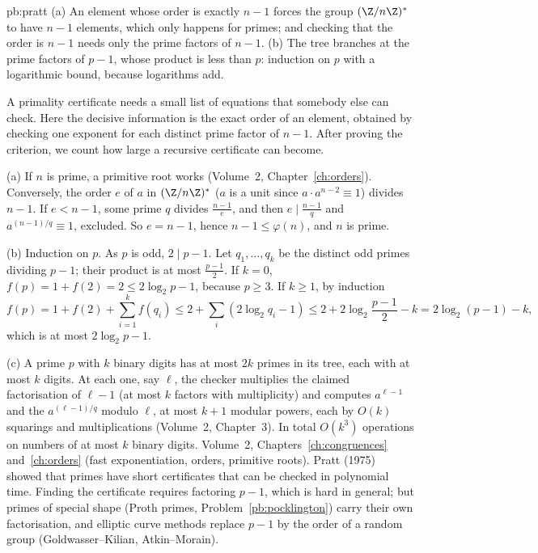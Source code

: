 \begin{solution}{pb:pratt}
\idea (a) An element whose order is exactly $n-1$ forces the group $(\Z/n\Z)^*$ to have $n-1$ elements, which only happens
for primes; and checking that the order is $n-1$ needs only the prime factors of $n-1$. (b) The tree branches at the prime
factors of $p-1$, whose product is less than $p$: induction on $p$ with a logarithmic bound, because logarithms add.

\writeup
A primality certificate needs a small list of equations that somebody else can check. Here the decisive information is the exact order of an element, obtained by checking one exponent for each distinct prime factor of $n-1$. After proving the criterion, we count how large a recursive certificate can become.

 (a) If $n$ is prime, a primitive root works (Volume~2, Chapter~\ref{ch:orders}). Conversely, the order $e$ of $a$ in $(\Z/n\Z)^*$ ($a$ is a
unit since $a\cdot a^{n-2}\equiv1$) divides $n-1$. If $e<n-1$, some prime $q$ divides $\frac{n-1}e$, and then $e\mid\frac{n-1}q$ and
$a^{(n-1)/q}\equiv1$, excluded. So $e=n-1$, hence $n-1\le\varphi(n)$, and $n$ is prime.

(b) Induction on $p$. As $p$ is odd, $2\mid p-1$. Let $q_1,\dots,q_k$ be the distinct odd primes dividing $p-1$; their product is at
most $\frac{p-1}2$. If $k=0$, $f(p)=1+f(2)=2\le2\log_2p-1$, because $p\ge3$. If $k\ge1$, by induction
\[
f(p)=1+f(2)+\sum_{i=1}^kf(q_i)\le2+\sum_i(2\log_2q_i-1)\le2+2\log_2\frac{p-1}2-k=2\log_2(p-1)-k,
\]
which is at most $2\log_2p-1$.

(c) A prime $p$ with $k$ binary digits has at most $2k$ primes in its tree, each with at most $k$ digits. At each one, say $\ell$, the
checker multiplies the claimed factorisation of $\ell-1$ (at most $k$ factors with multiplicity) and computes $a^{\ell-1}$ and the
$a^{(\ell-1)/q}$ modulo $\ell$, at most $k+1$ modular powers, each by $O(k)$ squarings and multiplications (Volume~2, Chapter~3). In
total $O(k^3)$ operations on numbers of at most $k$ binary digits.
\tools Volume~2, Chapters~\ref{ch:congruences} and~\ref{ch:orders} (fast exponentiation, orders, primitive roots).
\leads Pratt (1975) showed that primes have short certificates that can be checked in polynomial time. Finding the certificate requires factoring
$p-1$, which is hard in general; but primes of special shape (Proth primes, Problem~\ref{pb:pocklington}) carry their own
factorisation, and elliptic curve methods replace $p-1$ by the order of a random group (Goldwasser--Kilian, Atkin--Morain).
\end{solution}

